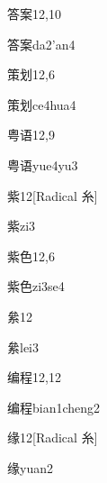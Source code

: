 \begin{entry}{答案}{12,10}
  \begin{phonetics}{答案}{da2'an4}
  \end{phonetics}
\end{entry}

\begin{entry}{策划}{12,6}
  \begin{phonetics}{策划}{ce4hua4}
  \end{phonetics}
\end{entry}

\begin{entry}{粤语}{12,9}
  \begin{phonetics}{粤语}{yue4yu3}
  \end{phonetics}
\end{entry}

\begin{entry}{紫}{12}[Radical 糸]
  \begin{phonetics}{紫}{zi3}
  \end{phonetics}
\end{entry}

\begin{entry}{紫色}{12,6}
  \begin{phonetics}{紫色}{zi3se4}
  \end{phonetics}
\end{entry}

\begin{entry}{絫}{12}
  \begin{phonetics}{絫}{lei3}
  \end{phonetics}
\end{entry}

\begin{entry}{编程}{12,12}
  \begin{phonetics}{编程}{bian1cheng2}
  \end{phonetics}
\end{entry}

\begin{entry}{缘}{12}[Radical 糸]
  \begin{phonetics}{缘}{yuan2}
  \end{phonetics}
\end{entry}

